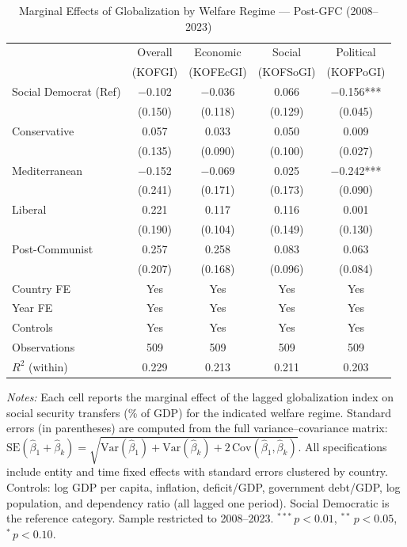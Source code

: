\begin{table}[htbp]
\centering
\caption{Marginal Effects of Globalization by Welfare Regime — Post-GFC (2008–2023)}
\label{tab:marginal_effects_post_gfc}
\begin{tabular}{lcccc}
\toprule
 & Overall & Economic & Social & Political \\
 & (KOFGI) & (KOFEcGI) & (KOFSoGI) & (KOFPoGI) \\
\midrule
Social Democrat (Ref) & $-$0.102 & $-$0.036 & \phantom{$-$}0.066 & $-$0.156*** \\
 & (0.150) & (0.118) & (0.129) & (0.045) \\
\addlinespace
Conservative & \phantom{$-$}0.057 & \phantom{$-$}0.033 & \phantom{$-$}0.050 & \phantom{$-$}0.009 \\
 & (0.135) & (0.090) & (0.100) & (0.027) \\
\addlinespace
Mediterranean & $-$0.152 & $-$0.069 & \phantom{$-$}0.025 & $-$0.242*** \\
 & (0.241) & (0.171) & (0.173) & (0.090) \\
\addlinespace
Liberal & \phantom{$-$}0.221 & \phantom{$-$}0.117 & \phantom{$-$}0.116 & \phantom{$-$}0.001 \\
 & (0.190) & (0.104) & (0.149) & (0.130) \\
\addlinespace
Post-Communist & \phantom{$-$}0.257 & \phantom{$-$}0.258 & \phantom{$-$}0.083 & \phantom{$-$}0.063 \\
 & (0.207) & (0.168) & (0.096) & (0.084) \\
\midrule
Country FE & Yes & Yes & Yes & Yes \\
Year FE & Yes & Yes & Yes & Yes \\
Controls & Yes & Yes & Yes & Yes \\
Observations & 509 & 509 & 509 & 509 \\
$R^2$ (within) & 0.229 & 0.213 & 0.211 & 0.203 \\
\bottomrule
\end{tabular}
\begin{tablenotes}
\small
\item \textit{Notes:} Each cell reports the marginal effect of the lagged globalization index on social security transfers (\% of GDP) for the indicated welfare regime. Standard errors (in parentheses) are computed from the full variance--covariance matrix: $\mathrm{SE}(\hat\beta_1 + \hat\beta_k) = \sqrt{\mathrm{Var}(\hat\beta_1) + \mathrm{Var}(\hat\beta_k) + 2\,\mathrm{Cov}(\hat\beta_1, \hat\beta_k)}$. All specifications include entity and time fixed effects with standard errors clustered by country. Controls: log GDP per capita, inflation, deficit/GDP, government debt/GDP, log population, and dependency ratio (all lagged one period). Social Democratic is the reference category. Sample restricted to 2008--2023. $^{***}\,p<0.01$, $^{**}\,p<0.05$, $^{*}\,p<0.10$.
\end{tablenotes}
\end{table}